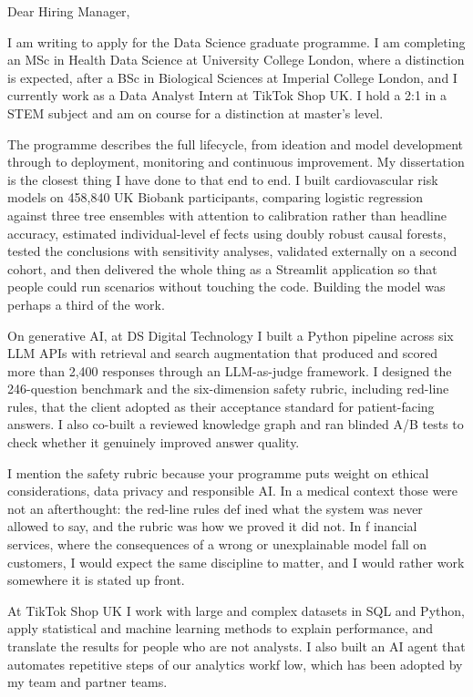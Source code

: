 \documentclass[letterpaper,11pt]{article}
\begin{document}
Dear Hiring Manager,

I am writing to apply for the Data Science graduate programme. I am completing an MSc in Health Data Science at University College London, where a distinction is expected, after a BSc in Biological Sciences at Imperial College London, and I currently work as a Data Analyst Intern at TikTok Shop UK. I hold a 2:1 in a STEM subject and am on course for a distinction at master's level.

The programme describes the full lifecycle, from ideation and model development through to deployment, monitoring and continuous improvement. My dissertation is the closest thing I have done to that end to end. I built cardiovascular risk models on 458,840 UK Biobank participants, comparing logistic regression against three tree ensembles with attention to calibration rather than headline accuracy, estimated individual-level ef\kern0pt fects using doubly robust causal forests, tested the conclusions with sensitivity analyses, validated externally on a second cohort, and then delivered the whole thing as a Streamlit application so that people could run scenarios without touching the code. Building the model was perhaps a third of the work.

On generative AI, at DS Digital Technology I built a Python pipeline across six LLM APIs with retrieval and search augmentation that produced and scored more than 2,400 responses through an LLM-as-judge framework. I designed the 246-question benchmark and the six-dimension safety rubric, including red-line rules, that the client adopted as their acceptance standard for patient-facing answers. I also co-built a reviewed knowledge graph and ran blinded A/B tests to check whether it genuinely improved answer quality.

I mention the safety rubric because your programme puts weight on ethical considerations, data privacy and responsible AI. In a medical context those were not an afterthought: the red-line rules def\kern0pt ined what the system was never allowed to say, and the rubric was how we proved it did not. In f\kern0pt inancial services, where the consequences of a wrong or unexplainable model fall on customers, I would expect the same discipline to matter, and I would rather work somewhere it is stated up front.

At TikTok Shop UK I work with large and complex datasets in SQL and Python, apply statistical and machine learning methods to explain performance, and translate the results for people who are not analysts. I also built an AI agent that automates repetitive steps of our analytics workf\kern0pt low, which has been adopted by my team and partner teams.
\end{document}
